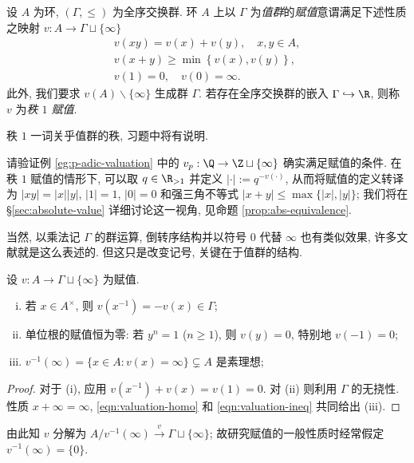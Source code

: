 \begin{definition}[W.\ Krull]\label{def:Krull-valuation}
	设 $A$ 为环, $(\Gamma, \leq)$ 为全序交换群. 环 $A$ 上以 $\Gamma$ 为\emph{值群}的\emph{赋值}意谓满足下述性质之映射 $v: A \to \Gamma \sqcup \{\infty\}$
	\begin{gather}
		v(xy) = v(x) + v(y), \quad x,y \in A, \label{eqn:valuation-homo} \\
		v(x+y) \geq \min\left\{ v(x), v(y) \right\}, \label{eqn:valuation-ineq} \\
		v(1) = 0, \quad v(0)=\infty \label{eqn:valuation-calibration}.
	\end{gather}
	此外, 我们要求 $v(A) \smallsetminus \{\infty\}$ 生成群 $\Gamma$. 若存在全序交换群的嵌入 $\Gamma \hookrightarrow \R$, 则称 $v$ 为\emph{秩 $1$ 赋值}.
\end{definition}
秩 $1$ 一词关乎值群的秩, 习题中将有说明.

请验证例 \ref{eg:p-adic-valuation} 中的 $v_p: \Q \to \Z \sqcup \{\infty\}$ 确实满足赋值的条件. 在秩 $1$ 赋值的情形下, 可以取 $q \in \R_{>1}$ 并定义 $|\cdot| := q^{-v(\cdot)}$, 从而将赋值的定义转译为 $|xy|=|x| |y|$, $|1|=1$, $|0|=0$ 和强三角不等式 $|x+y| \leq \max\{|x|, |y|\}$; 我们将在 \S\ref{sec:absolute-value} 详细讨论这一视角, 见命题 \ref{prop:abs-equivalence}.

当然, 以乘法记 $\Gamma$ 的群运算, 倒转序结构并以符号 $0$ 代替 $\infty$ 也有类似效果, 许多文献就是这么表述的. 但这只是改变记号, 关键在于值群的结构.

\begin{lemma}\label{prop:valuation-generalities}
	设 $v: A \to \Gamma \sqcup \{\infty\}$ 为赋值.
	\begin{enumerate}[(i)]
		\item 若 $x \in A^\times$, 则 $v(x^{-1}) = -v(x) \in \Gamma$;
		\item 单位根的赋值恒为零: 若 $y^n = 1$ ($n \geq 1$), 则 $v(y)=0$, 特别地 $v(-1)=0$;
		\item $v^{-1}(\infty) = \{x \in A: v(x) = \infty \} \subsetneq A$ 是素理想;
	\end{enumerate}
\end{lemma}
\begin{proof}
	对于 (i), 应用 $v(x^{-1})+v(x) = v(1)=0$. 对 (ii) 则利用 $\Gamma$ 的无挠性. 性质 $x+\infty=\infty$, \eqref{eqn:valuation-homo} 和 \eqref{eqn:valuation-ineq} 共同给出 (iii).
\end{proof}
由此知 $v$ 分解为 $A/v^{-1}(\infty) \xrightarrow{v} \Gamma \sqcup \{\infty\}$; 故研究赋值的一般性质时经常假定 $v^{-1}(\infty) = \{0\}$.

